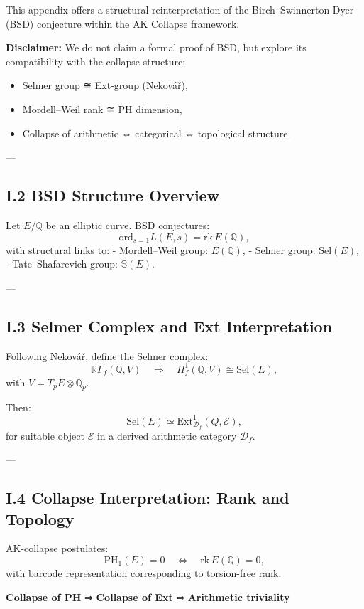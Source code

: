 \documentclass[11pt]{article}
\newcommand{\Sha}{\mathbb{S}}
\begin{document}
This appendix offers a structural reinterpretation of the Birch–Swinnerton-Dyer (BSD) conjecture  
within the AK Collapse framework.  

\textbf{Disclaimer:}  
We do not claim a formal proof of BSD, but explore its compatibility with the collapse structure:
\begin{itemize}
  \item Selmer group ≅ Ext-group (Nekovář),
  \item Mordell–Weil rank ≅ PH dimension,
  \item Collapse of arithmetic ⇔ categorical ⇔ topological structure.
\end{itemize}

---

\subsection*{I.2 BSD Structure Overview}

Let $E/\mathbb{Q}$ be an elliptic curve. BSD conjectures:
\[
\mathrm{ord}_{s=1} L(E,s) = \mathrm{rk}\,E(\mathbb{Q}),
\]
with structural links to:
- Mordell–Weil group: $E(\mathbb{Q})$,
- Selmer group: $\mathrm{Sel}(E)$,
- Tate–Shafarevich group: $\Sha(E)$.

---

\subsection*{I.3 Selmer Complex and Ext Interpretation}

Following Nekovář, define the Selmer complex:
\[
\mathbb{R}\Gamma_f(\mathbb{Q}, V) \quad \Rightarrow \quad H^1_f(\mathbb{Q}, V) \cong \mathrm{Sel}(E),
\]
with $V = T_p E \otimes \mathbb{Q}_p$.

Then:
\[
\mathrm{Sel}(E) \simeq \mathrm{Ext}^1_{\mathcal{D}_f}(Q, \mathcal{E}),
\]
for suitable object $\mathcal{E}$ in a derived arithmetic category $\mathcal{D}_f$.

---

\subsection*{I.4 Collapse Interpretation: Rank and Topology}

AK-collapse postulates:
\[
\mathrm{PH}_1(E) = 0 \quad \Leftrightarrow \quad \mathrm{rk}\,E(\mathbb{Q}) = 0,
\]
with barcode representation corresponding to torsion-free rank.

\textbf{Collapse of PH} ⇒ \textbf{Collapse of Ext} ⇒ \textbf{Arithmetic triviality}
\end{document}
